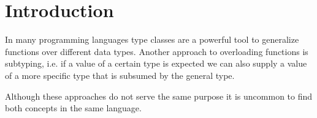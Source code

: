 
\chapter{Introduction}\label{ch:intro}


In many programming languages type classes are a powerful tool to generalize functions over different data types.
Another approach to overloading functions is subtyping, i.e. if a value of a certain type is expected we can also supply a value of a more specific type that is subsumed by the general type.

Although these approaches do not serve the same purpose it is uncommon to find both concepts in the same language.